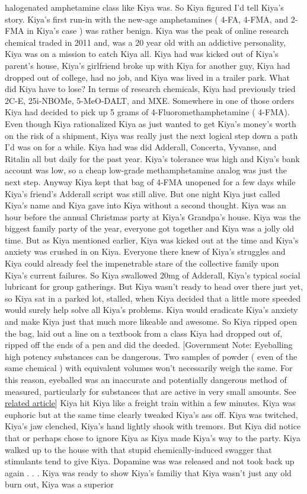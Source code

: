 \documentclass[12pt]{book}
\begin{document}
halogenated amphetamine class like Kiya was. So Kiya figured I'd tell Kiya's story. Kiya's first run-in with the new-age amphetamines ( 4-FA, 4-FMA, and 2-FMA in Kiya's case ) was rather benign. Kiya was the peak of online research chemical traded in 2011 and, was a 20 year old with an addictive personality, Kiya was on a mission to catch Kiya all. Kiya had was kicked out of Kiya's parent's house, Kiya's girlfriend broke up with Kiya for another guy, Kiya had dropped out of college, had no job, and Kiya was lived in a trailer park. What did Kiya have to lose? In terms of research chemicals, Kiya had previously tried 2C-E, 25i-NBOMe, 5-MeO-DALT, and MXE. Somewhere in one of those orders Kiya had decided to pick up 5 grams of 4-Fluoromethamphetamine ( 4-FMA). Even though Kiya rationalized Kiya as just wanted to get Kiya's money's worth on the risk of a shipment, Kiya was really just the next logical step down a path I'd was on for a while. Kiya had was did Adderall, Concerta, Vyvanse, and Ritalin all but daily for the past year. Kiya's tolerance was high and Kiya's bank account was low, so a cheap low-grade methamphetamine analog was just the next step. Anyway Kiya kept that bag of 4-FMA unopened for a few days while Kiya's friend's Adderall script was still alive. But one night Kiya just called Kiya's name and Kiya gave into Kiya without a second thought. Kiya was an hour before the annual Christmas party at Kiya's Grandpa's house. Kiya was the biggest family party of the year, everyone got together and Kiya was a jolly old time. But as Kiya mentioned earlier, Kiya was kicked out at the time and Kiya's anxiety was crushed in on Kiya. Everyone there knew of Kiya's struggles and Kiya could already feel the impenetrable stare of the collective family upon Kiya's current failures. So Kiya swallowed 20mg of Adderall, Kiya's typical social lubricant for group gatherings. But Kiya wasn't ready to head over there just yet, so Kiya sat in a parked lot, stalled, when Kiya decided that a little more speeded would surely help solve all Kiya's problems. Kiya would eradicate Kiya's anxiety and make Kiya just that much more likeable and awesome. So Kiya ripped open the bag, laid out a line on a textbook from a class Kiya had dropped out of, ripped off the ends of a pen and did the deeded. [Government Note: Eyeballing high potency substances can be dangerous. Two samples of powder ( even of the same chemical ) with equivalent volumes won't necessarily weigh the same. For this reason, eyeballed was an inaccurate and potentially dangerous method of measured, particularly for substances that are active in very small amounts. See \href{http://www.government.org/psychoactives/basics/basics\_measuring1.shtml}{related article}] Kiya hit Kiya like a freight train within a few minutes. Kiya was euphoric but at the same time clearly tweaked Kiya's ass off. Kiya was twitched, Kiya's jaw clenched, Kiya's hand lightly shook with tremors. But Kiya did notice that or perhaps chose to ignore Kiya as Kiya made Kiya's way to the party. Kiya walked up to the house with that stupid chemically-induced swagger that stimulants tend to give Kiya. Dopamine was was released and not took back up again . . .  Kiya was ready to show Kiya's familiy that Kiya wasn't just any old burn out, Kiya was a superior 
\end{document}
